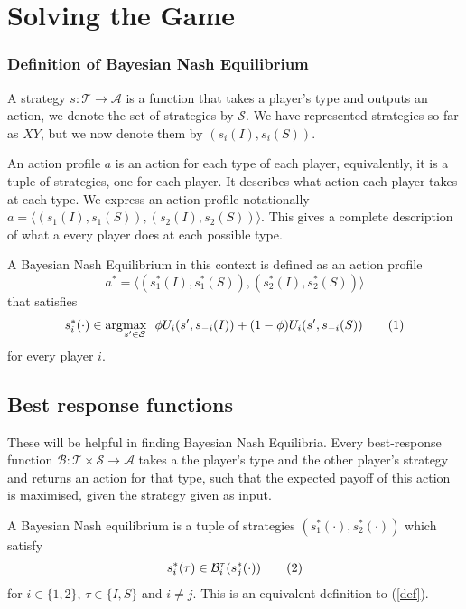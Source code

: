 \documentclass{article}
\theoremstyle{definition}
\theoremstyle{exercise}
\theoremstyle{remark}
\newcommand\nt{\addtocounter{equation}{1}\tag{\theequation}}
\begin{document}
\section{Solving the Game}
\subsubsection*{Definition of Bayesian Nash Equilibrium}
A strategy $s : \mathcal{T} \to \mathcal{A}$ is a function that takes a player's type and outputs an action, we denote the set of strategies by $\mathcal{S}$.
We have represented strategies so far as $XY$, but we now denote them by $(s_i(I), s_i(S))$.

An action profile $a$ is an action for each type of each player, equivalently, it is a tuple of strategies, one for each player. It describes what action each player takes at each type. We express an action profile notationally $a = \langle (s_{1}(I), s_1(S)), (s_2(I), s_2(S)) \rangle$. This gives a complete description of what a every player does at each possible type.

A Bayesian Nash Equilibrium in this context is defined as an action profile $$a^* = \langle  (s^*_1(I), s^{*}_1(S)), (s_2^{*}(I), s_2^*(S)) \rangle$$ 
that satisfies
\begin{align*}
    s^*_i(\cdot) \in \arg\!\max_{s' \in \mathcal{S}} \;\: \phi U_i(s', s_{-i}(I)) + (1 - \phi) U_i(s', s_{-i}(S)) \nt \label{def}
\end{align*}
for every player $i$.


\subsection*{Best response functions}
These will be helpful in finding Bayesian Nash Equilibria.
Every best-response function $\mathcal{B} : \mathcal{T} \times \mathcal{S} \to \mathcal{A}$ takes a the player's type and the other player's strategy and returns an action for that type, such that the expected payoff of this action is maximised, given the strategy given as input.

A Bayesian Nash equilibrium is a tuple of strategies $(s^*_1(\cdot), s^*_2(\cdot))$ which satisfy
\[
s^*_i(\tau) \in \mathcal{B}_i^{\tau}(s^*_j(\cdot)) \nt \label{bnetest}
\]
for $i \in \{1,2\} $, $\tau \in \{I, S\} $ and $i \neq j$. This is an equivalent definition to (\ref{def}).
\end{document}
